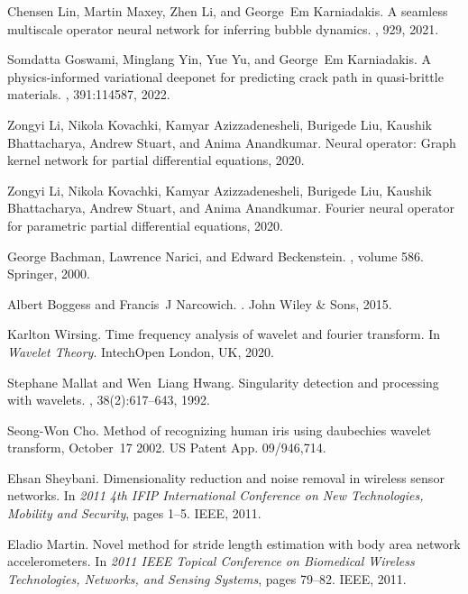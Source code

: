 \documentclass{article}
\begin{document}
\begin{thebibliography}{10}
Chensen Lin, Martin Maxey, Zhen Li, and George~Em Karniadakis.
\newblock A seamless multiscale operator neural network for inferring bubble
  dynamics.
, 929, 2021.

Somdatta Goswami, Minglang Yin, Yue Yu, and George~Em Karniadakis.
\newblock A physics-informed variational deeponet for predicting crack path in
  quasi-brittle materials.
,
  391:114587, 2022.

Zongyi Li, Nikola Kovachki, Kamyar Azizzadenesheli, Burigede Liu, Kaushik
  Bhattacharya, Andrew Stuart, and Anima Anandkumar.
\newblock Neural operator: Graph kernel network for partial differential
  equations, 2020.

Zongyi Li, Nikola Kovachki, Kamyar Azizzadenesheli, Burigede Liu, Kaushik
  Bhattacharya, Andrew Stuart, and Anima Anandkumar.
\newblock Fourier neural operator for parametric partial differential
  equations, 2020.

George Bachman, Lawrence Narici, and Edward Beckenstein.
, volume 586.
\newblock Springer, 2000.

Albert Boggess and Francis~J Narcowich.
.
\newblock John Wiley \& Sons, 2015.

Karlton Wirsing.
\newblock Time frequency analysis of wavelet and fourier transform.
\newblock In {\em Wavelet Theory}. IntechOpen London, UK, 2020.

Stephane Mallat and Wen~Liang Hwang.
\newblock Singularity detection and processing with wavelets.
, 38(2):617--643, 1992.

Seong-Won Cho.
\newblock Method of recognizing human iris using daubechies wavelet transform,
  October~17 2002.
\newblock US Patent App. 09/946,714.

Ehsan Sheybani.
\newblock Dimensionality reduction and noise removal in wireless sensor
  networks.
\newblock In {\em 2011 4th IFIP International Conference on New Technologies,
  Mobility and Security}, pages 1--5. IEEE, 2011.

Eladio Martin.
\newblock Novel method for stride length estimation with body area network
  accelerometers.
\newblock In {\em 2011 IEEE Topical Conference on Biomedical Wireless
  Technologies, Networks, and Sensing Systems}, pages 79--82. IEEE, 2011.


\end{thebibliography}
\end{document}

